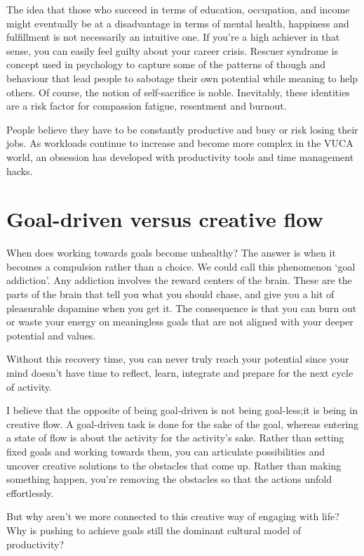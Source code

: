 \documentclass[ebook,12pt,oneside,openany]{memoir}
\begin{document}
The idea that those who succeed in terms of education, occupation, and income might eventually be at a disadvantage in terms of mental health, happiness and fulfillment is not necessarily an intuitive one.
If you're a high achiever in that sense, you can easily feel guilty about your career crisis.
Rescuer syndrome is concept used in psychology to capture some of the patterns of though and behaviour that lead people to sabotage their own potential while meaning to help others.
Of course, the notion of self-sacrifice is noble. Inevitably, these identities are a risk factor for compassion fatigue, resentment and burnout.

People believe they have to be constantly productive and busy or risk losing their jobs. As workloads continue to increase and become more complex in the VUCA world, an obsession has developed with productivity tools and time management hacks. 

\section{Goal-driven versus creative flow}
When does working towards goals become unhealthy? The answer is when it becomes a compulsion rather than a choice.
We could call this phenomenon `goal addiction'. Any addiction involves the reward centers of the brain.
These are the parts of the brain that tell you what you should chase, and give you a hit of pleasurable dopamine when you get it.
The consequence is that you can burn out or waste your energy on meaningless goals that are not aligned with your deeper potential and values. 

Without this recovery time, you can never truly reach your potential since your mind doesn't have time to reflect, learn, integrate and prepare for the next cycle of activity.

I believe that the opposite of being goal-driven is not being goal-less;it is being in creative flow.
A goal-driven task is done for the sake of the goal, whereas entering a state of flow is about the activity for the activity's sake.
Rather than setting fixed goals and working towards them, you can articulate possibilities and uncover creative solutions to the obstacles that come up.
Rather than making something happen, you're removing the obstacles so that the actions unfold effortlessly.

But why aren't we more connected to this creative way of engaging with life? Why is pushing to achieve goals still the dominant cultural model of productivity?
\end{document}
